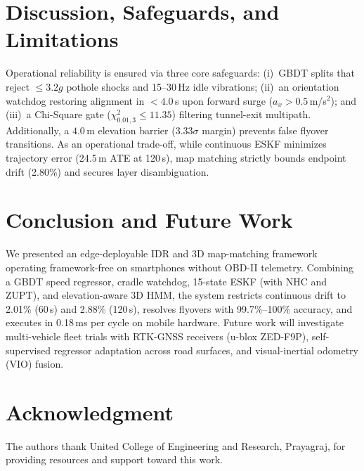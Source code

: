 \documentclass[conference]{IEEEtran}
\begin{document}
\section{Discussion, Safeguards, and Limitations}
Operational reliability is ensured via three core safeguards: (i)~GBDT splits that reject $\le 3.2g$ pothole shocks and 15--30\,Hz idle vibrations; (ii)~an orientation watchdog restoring alignment in $<4.0$\,s upon forward surge ($a_x > 0.5$\,m/s$^2$); and (iii)~a Chi-Square gate ($\chi^2_{0.01, 3} \le 11.35$) filtering tunnel-exit multipath. Additionally, a $4.0$\,m elevation barrier ($3.33\sigma$ margin) prevents false flyover transitions. As an operational trade-off, while continuous ESKF minimizes trajectory error (24.5\,m ATE at 120\,s), map matching strictly bounds endpoint drift (2.80\%) and secures layer disambiguation.

\section{Conclusion and Future Work}
We presented an edge-deployable IDR and 3D map-matching framework operating framework-free on smartphones without OBD-II telemetry. Combining a GBDT speed regressor, cradle watchdog, 15-state ESKF (with NHC and ZUPT), and elevation-aware 3D HMM, the system restricts continuous drift to 2.01\% (60\,s) and 2.88\% (120\,s), resolves flyovers with 99.7\%--100\% accuracy, and executes in 0.18\,ms per cycle on mobile hardware. Future work will investigate multi-vehicle fleet trials with RTK-GNSS receivers (u-blox ZED-F9P), self-supervised regressor adaptation across road surfaces, and visual-inertial odometry (VIO) fusion.

\section*{Acknowledgment}
The authors thank United College of Engineering and Research, Prayagraj, for providing resources and support toward this work.
\end{document}

